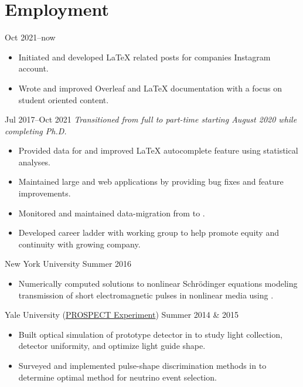 \documentclass{cultvoucher}
\begin{document}
\section{Employment}
{Oct 2021--now}
\begin{itemize}
	\vspace{-0.25em}
	\item Initiated and developed \LaTeX{} related posts for companies Instagram account.
	\item Wrote and improved Overleaf and \LaTeX{} documentation with a focus on student oriented content.
\end{itemize}
{Jul 2017--Oct 2021}
\vspace{-0.25em}
\emph{Transitioned from full to part-time starting August 2020 while completing Ph.D.}
\begin{itemize}
	\vspace{-0.25em}
	\item Provided data for and improved \LaTeX{} autocomplete feature using statistical analyses.
	\item Maintained large  and  web applications by providing bug fixes and feature improvements.
	\item Monitored and maintained data-migration from  to .
	\item Developed career ladder with working group to help promote equity and continuity with growing company.
\end{itemize}

{New York University}
{Summer 2016}
\begin{itemize}
	\vspace{-0.25em}
	\item Numerically computed solutions to nonlinear Schr\"{o}dinger equations modeling transmission of short electromagnetic pulses in nonlinear media using .
\end{itemize}

{Yale University (\href{http://prospect.yale.edu/}{\small{PROSPECT Experiment}})}
{Summer 2014 \& 2015}
\begin{itemize}
	\vspace{-0.25em}
	\item Built optical simulation of prototype detector in  to study light collection, detector uniformity, and optimize light guide shape.
	\item Surveyed and implemented pulse-shape discrimination methods in  to determine optimal method for neutrino event selection.
\end{itemize}
\end{document}
